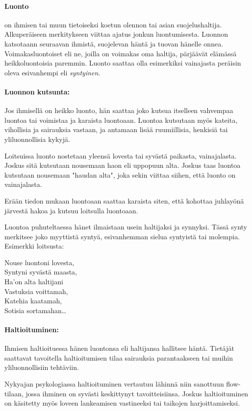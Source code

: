   \paragraph{Luonto} on ihmisen tai muun tietoiseksi koetun olennon tai asian suojelushaltija.
    Alkuperäiseen merkitykseen viittaa ajatus jonkun luontumisesta. Luonnon katsotaann
    seuraavan ihmistä, suojelevan häntä ja tuovan hänelle onnea. Voimakasluontoiset eli ne,
    joilla on voimakas oma haltija, pärjäävät elämässä heikkoluontoisia paremmin. Luonto
    saattaa olla esimerkiksi vainajasta peräisin oleva esivanhempi eli \emph{syntyinen}.
  \paragraph{Luonnon kutsunta:} Jos ihmisellä on heikko luonto, hän saattaa joko kutsua itselleen
    vahvempaa luontoa tai voimistaa ja karaista luontoaan. Luontoa kutsutaan myös kateita,
    vihollisia ja sairauksia vastaan, ja antamaan lisää ruumiillisia, henkisiä tai yliluonnollisia
    kykyjä.
    \par
    Loitsuissa luonto nostetaan yleensä lovesta tai syvästä paikasta, vainajalasta. Joskus sitä
    kutsutaan nousemaan haon eli uppopuun alta. Joskus taas luontoa kutsutaan nousemaan "haudan
    alta", joka sekin viittaa siihen, että luonto on vainajalasta.
    \par
    Erään tiedon mukaan luontoaan saattaa karaista siten, että kohottaa juhlayönä järvestä hakoa
    ja kutsuu loitsulla luontoaan.
    \par
    Luontoa puhuteltaessa hänet ilmaistaan usein haltijaksi ja synnyksi. Tässä synty merkitsee
    joko myyttistä syntyä, esivanhemman sielua syntyistä tai molempia. Esimerkki loitsusta:

    \begin{center}\begin{em}
      Nouse luontoni lovesta,\\
      Syntyni syvästä maasta,\\
      Ha'on alta haltijani\\
      Vastuksia voittamah,\\
      Katehia kaatamah,\\
      Sotisia sortamahan\ldots\\
    \end{em}\end{center}

  \paragraph{Haltioituminen:} Ihmisen haltioituessa hänen luontonsa eli haltijansa hallitsee
    häntä. Tietäjät saattavat tavoitella haltioitumisen tilaa sairauksia parantaakseen tai
    muihin yliluonnollisiin tehtäviin.
    \par
    Nykyajan psykologiassa haltioituminen vertautuu lähinnä niin sanottuun flow-tilaan, jossa
    ihminen on syvästi keskittynyt tavoitteisiinsa. Joskus haltioituminen on käsitetty myös
    loveen lankeamisen vastineeksi tai taikojen harjoittamiseksi.
